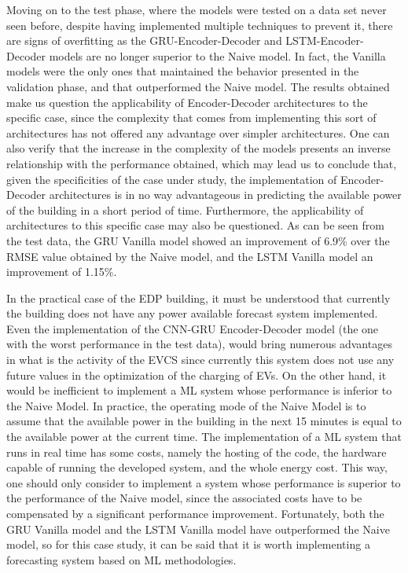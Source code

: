 Moving on to the test phase, where the models were tested on a data set never seen before, despite having implemented multiple techniques to prevent it, there are signs of overfitting as the \ac{GRU}-Encoder-Decoder  and \ac{LSTM}-Encoder-Decoder models are no longer superior to the Naive model. In fact, the Vanilla models were the only ones that maintained the behavior presented in the validation phase, and that outperformed the Naive model. The results obtained make us question the applicability of Encoder-Decoder architectures to the specific case, since the complexity that comes from implementing this sort of architectures has not offered any advantage over simpler architectures. One can also verify that the increase in the complexity of the models presents an inverse relationship with the performance obtained, which may lead us to conclude that, given the specificities of the case under study, the implementation of Encoder-Decoder architectures is in no way advantageous in predicting the available power of the building in a short period of time. Furthermore, the applicability of architectures to this specific case may also be questioned. As can be seen from the test data, the \ac{GRU} Vanilla model showed an improvement of 6.9\% over the \ac{RMSE} value obtained by the Naive model, and the \ac{LSTM} Vanilla model an improvement of 1.15\%. 


 
In the practical case of the EDP building, it must be understood that currently the building does not have any power available forecast system implemented. Even the implementation of the \ac{CNN}-\ac{GRU} Encoder-Decoder model (the one with the worst performance in the test data), would bring numerous advantages in what is the activity of the \ac{EVCS} since currently this system does not use any future values in the optimization of the charging of \ac{EV}s. On the other hand, it would be inefficient to implement a \ac{ML}  system whose performance is inferior to the Naive Model. In practice, the operating mode of the Naive Model is to assume that the available power in the building in the next 15 minutes is equal to the available power at the current time. The implementation of a \ac{ML} system that runs in real time has some costs, namely the hosting of the code, the hardware capable of running the developed system, and the whole energy cost. This way, one should only consider to implement a system whose performance is superior to the performance of the Naive model, since the associated costs have to be compensated by a significant performance improvement. Fortunately, both the \ac{GRU} Vanilla model and the \ac{LSTM} Vanilla model have outperformed the Naive model, so for this case study, it can be said that it is worth implementing a forecasting system based on \ac{ML} methodologies.

